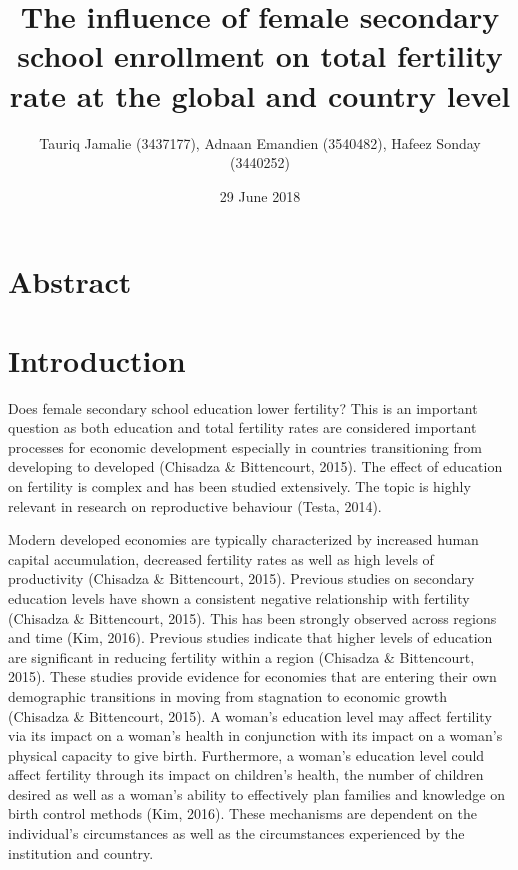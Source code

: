 \documentclass[11pt,]{article}
\title{The influence of female secondary school enrollment on total fertility
rate at the global and country level}
\author{Tauriq Jamalie (3437177), Adnaan Emandien (3540482), Hafeez Sonday
(3440252)}
\date{29 June 2018}
\begin{document}
\maketitle

\section{Abstract}\label{abstract}

\section{Introduction}\label{introduction}

Does female secondary school education lower fertility? This is an
important question as both education and total fertility rates are
considered important processes for economic development especially in
countries transitioning from developing to developed (Chisadza \&
Bittencourt, 2015). The effect of education on fertility is complex and
has been studied extensively. The topic is highly relevant in research
on reproductive behaviour (Testa, 2014).

Modern developed economies are typically characterized by increased
human capital accumulation, decreased fertility rates as well as high
levels of productivity (Chisadza \& Bittencourt, 2015). Previous studies
on secondary education levels have shown a consistent negative
relationship with fertility (Chisadza \& Bittencourt, 2015). This has
been strongly observed across regions and time (Kim, 2016). Previous
studies indicate that higher levels of education are significant in
reducing fertility within a region (Chisadza \& Bittencourt, 2015).
These studies provide evidence for economies that are entering their own
demographic transitions in moving from stagnation to economic growth
(Chisadza \& Bittencourt, 2015). A woman's education level may affect
fertility via its impact on a woman's health in conjunction with its
impact on a woman's physical capacity to give birth. Furthermore, a
woman's education level could affect fertility through its impact on
children's health, the number of children desired as well as a woman's
ability to effectively plan families and knowledge on birth control
methods (Kim, 2016). These mechanisms are dependent on the individual's
circumstances as well as the circumstances experienced by the
institution and country.
\end{document}
